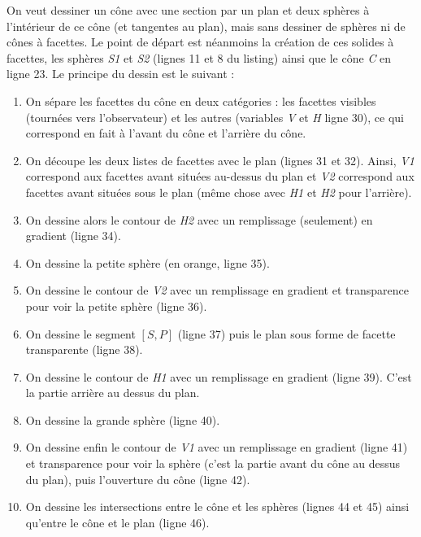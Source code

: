 \documentclass[%
10pt,%
a4paper,%
french,%
]%
{article}%
\begin{document}
On veut dessiner un cône avec une section par un plan et deux sphères à l'intérieur de ce cône (et tangentes au plan), mais sans dessiner de sphères ni de cônes à facettes. Le point de départ est néanmoins la création de ces solides à facettes, les sphères \emph{S1} et \emph{S2} (lignes 11 et 8 du listing) ainsi que le cône \emph{C} en ligne 23. Le principe du dessin est le suivant :
\begin{enumerate}
    \item On sépare les facettes du cône en deux catégories : les facettes visibles (tournées vers l'observateur) et les autres (variables \emph{V} et \emph{H} ligne 30), ce qui correspond en fait à l'avant du cône et l'arrière du cône.
    \item On découpe les deux listes de facettes avec le plan (lignes 31 et 32). Ainsi, \emph{V1} correspond aux facettes avant situées au-dessus du plan et \emph{V2} correspond aux facettes avant situées sous le plan (même chose avec \emph{H1} et \emph{H2} pour l'arrière).
    \item On dessine alors le contour de \emph{H2} avec un remplissage (seulement) en gradient (ligne 34).
    \item On dessine la petite sphère (en orange, ligne 35).
    \item On dessine le contour de \emph{V2} avec un remplissage en gradient et transparence pour voir la petite sphère  (ligne 36).
    \item On dessine le segment $[S,P]$ (ligne 37) puis le plan sous forme de facette transparente (ligne 38).
    \item On dessine le contour de \emph{H1} avec un remplissage en gradient (ligne 39). C'est la partie arrière au dessus du plan.
    \item On dessine la grande sphère (ligne 40).
    \item On dessine enfin le contour de \emph{V1} avec un remplissage en gradient (ligne 41) et transparence pour voir la sphère (c'est la partie avant du cône au dessus du plan), puis l'ouverture du cône (ligne 42).
    \item On dessine les intersections entre le cône et les sphères (lignes 44 et 45) ainsi qu'entre le cône et le plan (ligne 46).
\end{enumerate}
\end{document}

